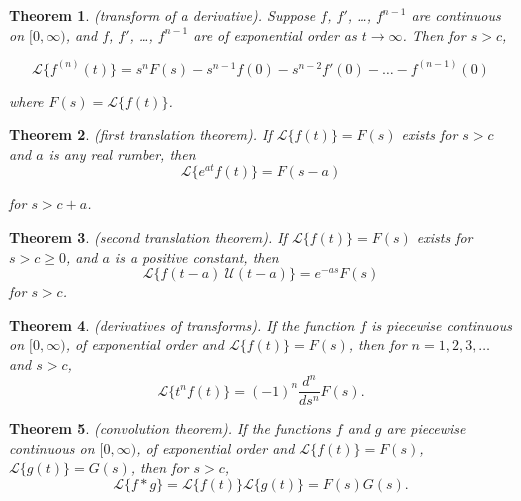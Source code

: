 \documentclass{article}
\theoremstyle{plain}
\newtheorem{thm}{Theorem}[section]
\theoremstyle{definition}
\theoremstyle{remark}
\begin{document}
\begin{thm} (transform of a derivative). 
    Suppose \(f\), \(f'\), \ldots, \(f^{n-1}\) are continuous on \([0, \infty)\), and \(f\), \(f'\), \ldots, \(f^{n-1}\) are of exponential order as \(t \to \infty\). Then for \(s > c\),
    
    \begin{equation}
        \mathcal{L} \{f^{(n)}(t)\} = s^n F(s) - s^{n-1} f(0) - s^{n-2} f'(0) - \ldots - f^{(n-1)}(0)
    \end{equation}

    \noindent where \(F(s) = \mathcal{L} \{f(t)\}\).
\end{thm}

\begin{thm} (first translation theorem).
    If \(\mathcal{L} \{f(t)\} = F(s)\) exists for \(s > c\) and \(a\) is any real rumber, then
    \begin{equation}
        \mathcal{L} \{e^{at} f(t)\} = F(s-a)
    \end{equation}

    \noindent for \(s > c + a\).
\end{thm}

\begin{thm} (second translation theorem).
    If \(\mathcal{L} \{f(t)\} = F(s)\) exists for \(s > c \geq 0\), and \(a\) is a positive constant, then
    \begin{equation}
        \mathcal{L} \{f(t-a)\ \mathcal{U}(t-a)\} = e^{-as}F(s)
    \end{equation}
    \noindent for \(s > c\).
\end{thm}

\begin{thm} (derivatives of transforms).
    If the function \(f\) is piecewise continuous on \([0,\infty)\), of exponential order and \(\mathcal{L} \{f(t)\} = F(s)\), then for \(n = 1, 2, 3, \ldots\) and \(s > c\),
    \begin{equation}
        \mathcal{L} \{t^n f(t)\} = (-1)^n\frac{d^n}{ds^n} F(s).
    \end{equation}
\end{thm}

\begin{thm} (convolution theorem).
    If the functions \(f\) and \(g\) are piecewise continuous on \([0,\infty)\), of exponential order and \(\mathcal{L} \{f(t)\} = F(s)\), \(\mathcal{L} \{g(t)\} = G(s)\), then for \(s > c\),
    \begin{equation}
        \mathcal{L} \{f*g\} = \mathcal{L} \{f(t)\} \mathcal{L} \{g(t)\} = F(s)G(s).
    \end{equation}
\end{thm}
\end{document}
